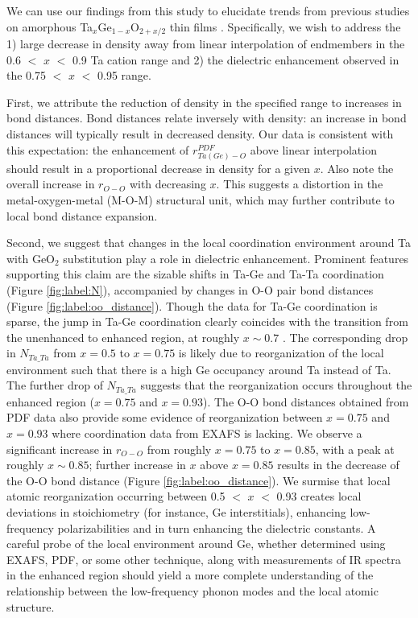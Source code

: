 We can use our findings from this study to elucidate trends from previous studies on amorphous Ta$_{x}$Ge$_{1-x}$O$_{2+x/2}$ thin films \cite{Naoi2018jap}. Specifically, we wish to address the 1) large decrease in density away from linear interpolation of endmembers in the 0.6 $<$ $x$ $<$ 0.9 Ta cation range and 2) the dielectric enhancement observed in the 0.75 $<$ $x$ $<$ 0.95 range. 

First, we attribute the reduction of density in the specified range to increases in bond distances. Bond distances relate inversely with density: an increase in bond distances will typically result in decreased density. 
Our data is consistent with this expectation: the enhancement of $r_{Ta(Ge)-O}^{PDF}$ above linear interpolation should result in a proportional decrease in density for a given $x$. Also note the overall increase in $r_{O-O}$ with decreasing $x$. This suggests a distortion in the metal-oxygen-metal (M-O-M) structural unit, which may further contribute to local bond distance expansion.

Second, we suggest that changes in the local coordination environment around Ta with GeO$_{2}$ substitution play a role in dielectric enhancement. Prominent features supporting this claim are the sizable shifts in Ta-Ge and Ta-Ta coordination (Figure \ref{fig:label:N}), accompanied by changes in O-O pair bond distances (Figure \ref{fig:label:oo_distance}). Though the data for Ta-Ge coordination is sparse, the jump in Ta-Ge coordination clearly coincides with the transition from the unenhanced to enhanced region, at roughly $x \sim 0.7$ \cite{Naoi2018jap}. The corresponding drop in $N_{Ta\_Ta}$ from $x = 0.5$ to $x = 0.75$ is likely due to reorganization of the local environment such that there is a high Ge occupancy around Ta instead of Ta. The further drop of $N_{Ta\_Ta}$ suggests that the reorganization occurs throughout the enhanced region ($x = 0.75$ and $x = 0.93$). The O-O bond distances obtained from PDF data also provide some evidence of reorganization between $x = 0.75$ and $x = 0.93$ where coordination data from EXAFS is lacking. We observe a significant increase in $r_{O-O}$ from roughly $x = 0.75$ to $x = 0.85$, with a peak at roughly $x \sim 0.85$; further increase in $x$ above $x = 0.85$ results in the decrease of the O-O bond distance (Figure \ref{fig:label:oo_distance}). We surmise that local atomic reorganization occurring between 0.5 $<$ $x$ $<$ 0.93 creates local deviations in stoichiometry (for instance, Ge interstitials), enhancing low-frequency polarizabilities and in turn enhancing the dielectric constants. A careful probe of the local environment around Ge, whether determined using EXAFS, PDF, or some other technique, along with measurements of IR spectra in the enhanced region should yield a more complete understanding of the relationship between the low-frequency phonon modes and the local atomic structure. 

